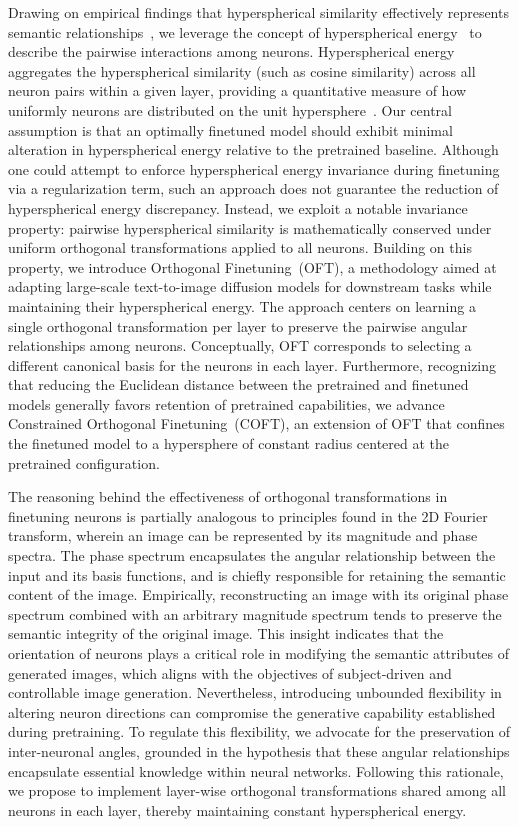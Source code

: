 Drawing on empirical findings that hyperspherical similarity effectively represents semantic relationships~\cite{liu2017deep,liu2018decoupled,chen2020angular}, we leverage the concept of hyperspherical energy~\cite{liu2018learning} to describe the pairwise interactions among neurons. Hyperspherical energy aggregates the hyperspherical similarity (such as cosine similarity) across all neuron pairs within a given layer, providing a quantitative measure of how uniformly neurons are distributed on the unit hypersphere~\cite{liu2021learning}. Our central assumption is that an optimally finetuned model should exhibit minimal alteration in hyperspherical energy relative to the pretrained baseline. Although one could attempt to enforce hyperspherical energy invariance during finetuning via a regularization term, such an approach does not guarantee the reduction of hyperspherical energy discrepancy. Instead, we exploit a notable invariance property: pairwise hyperspherical similarity is mathematically conserved under uniform orthogonal transformations applied to all neurons. Building on this property, we introduce Orthogonal Finetuning~(OFT), a methodology aimed at adapting large-scale text-to-image diffusion models for downstream tasks while maintaining their hyperspherical energy. The approach centers on learning a single orthogonal transformation per layer to preserve the pairwise angular relationships among neurons. Conceptually, OFT corresponds to selecting a different canonical basis for the neurons in each layer. Furthermore, recognizing that reducing the Euclidean distance between the pretrained and finetuned models generally favors retention of pretrained capabilities, we advance Constrained Orthogonal Finetuning~(COFT), an extension of OFT that confines the finetuned model to a hypersphere of constant radius centered at the pretrained configuration.

The reasoning behind the effectiveness of orthogonal transformations in finetuning neurons is partially analogous to principles found in the 2D Fourier transform, wherein an image can be represented by its magnitude and phase spectra. The phase spectrum encapsulates the angular relationship between the input and its basis functions, and is chiefly responsible for retaining the semantic content of the image. Empirically, reconstructing an image with its original phase spectrum combined with an arbitrary magnitude spectrum tends to preserve the semantic integrity of the original image. This insight indicates that the orientation of neurons plays a critical role in modifying the semantic attributes of generated images, which aligns with the objectives of subject-driven and controllable image generation. Nevertheless, introducing unbounded flexibility in altering neuron directions can compromise the generative capability established during pretraining. To regulate this flexibility, we advocate for the preservation of inter-neuronal angles, grounded in the hypothesis that these angular relationships encapsulate essential knowledge within neural networks. Following this rationale, we propose to implement layer-wise orthogonal transformations shared among all neurons in each layer, thereby maintaining constant hyperspherical energy.

